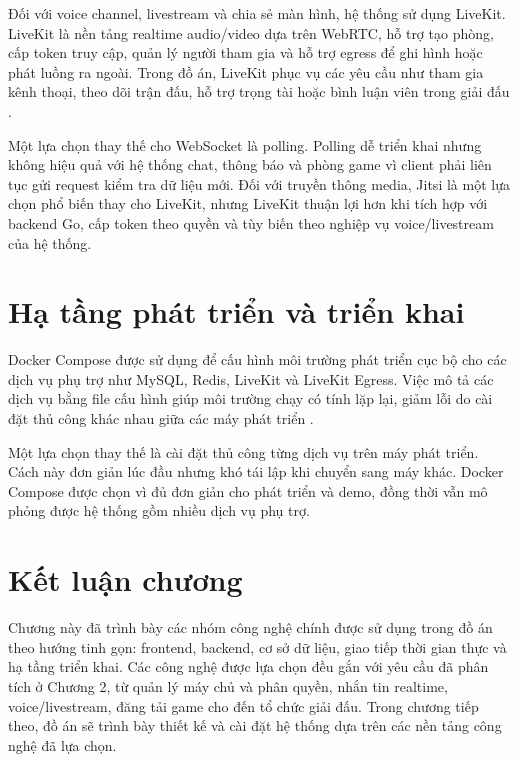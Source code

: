 \documentclass[../DoAn.tex]{subfiles}
\begin{document}
Đối với voice channel, livestream và chia sẻ màn hình, hệ thống sử dụng LiveKit. LiveKit là nền tảng realtime audio/video dựa trên WebRTC, hỗ trợ tạo phòng, cấp token truy cập, quản lý người tham gia và hỗ trợ egress để ghi hình hoặc phát luồng ra ngoài. Trong đồ án, LiveKit phục vụ các yêu cầu như tham gia kênh thoại, theo dõi trận đấu, hỗ trợ trọng tài hoặc bình luận viên trong giải đấu \cite{webrtc-docs,livekit-docs}.

Một lựa chọn thay thế cho WebSocket là polling. Polling dễ triển khai nhưng không hiệu quả với hệ thống chat, thông báo và phòng game vì client phải liên tục gửi request kiểm tra dữ liệu mới. Đối với truyền thông media, Jitsi là một lựa chọn phổ biến thay cho LiveKit, nhưng LiveKit thuận lợi hơn khi tích hợp với backend Go, cấp token theo quyền và tùy biến theo nghiệp vụ voice/livestream của hệ thống.

\section{Hạ tầng phát triển và triển khai}
\label{section:3.6}

Docker Compose được sử dụng để cấu hình môi trường phát triển cục bộ cho các dịch vụ phụ trợ như MySQL, Redis, LiveKit và LiveKit Egress. Việc mô tả các dịch vụ bằng file cấu hình giúp môi trường chạy có tính lặp lại, giảm lỗi do cài đặt thủ công khác nhau giữa các máy phát triển \cite{docker-compose-docs}.

Một lựa chọn thay thế là cài đặt thủ công từng dịch vụ trên máy phát triển. Cách này đơn giản lúc đầu nhưng khó tái lập khi chuyển sang máy khác. Docker Compose được chọn vì đủ đơn giản cho phát triển và demo, đồng thời vẫn mô phỏng được hệ thống gồm nhiều dịch vụ phụ trợ.

\section{Kết luận chương}
\label{section:3.7}

Chương này đã trình bày các nhóm công nghệ chính được sử dụng trong đồ án theo hướng tinh gọn: frontend, backend, cơ sở dữ liệu, giao tiếp thời gian thực và hạ tầng triển khai. Các công nghệ được lựa chọn đều gắn với yêu cầu đã phân tích ở Chương 2, từ quản lý máy chủ và phân quyền, nhắn tin realtime, voice/livestream, đăng tải game cho đến tổ chức giải đấu. Trong chương tiếp theo, đồ án sẽ trình bày thiết kế và cài đặt hệ thống dựa trên các nền tảng công nghệ đã lựa chọn.
\end{document}

